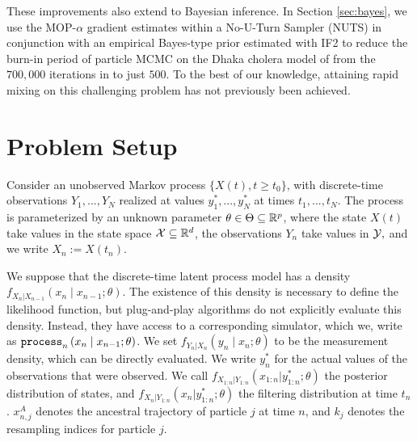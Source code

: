 \documentclass[9pt,twocolumn,pnasresearcharticle]{pnas-new}
\newcommand\arxiv[2]{#2} %
\begin{document}
These improvements also extend to Bayesian inference. In Section \ref{sec:bayes}, we use the MOP-$\alpha$ gradient estimates within a No-U-Turn Sampler (NUTS) \cite{homan14} in conjunction with an empirical Bayes-type prior estimated with IF2 to reduce the burn-in period of particle MCMC \cite{andrieu10} on the Dhaka cholera model of \cite{king08} from the $700,000$ iterations in \cite{fasiolo16} to just $500$. To the best of our knowledge, attaining rapid mixing on this challenging problem has not previously been achieved. 

\arxiv{}{\vspace*{-2mm}}
\section{Problem Setup}

Consider an unobserved Markov process $\{X(t),t  \geq t_0\}$, with discrete-time observations $Y_1,...,Y_N$ realized at values $y_1^*,...,y_N^*$ at times $t_1,..., t_N$.
The process is parameterized by an unknown parameter $\theta \in \Theta \subseteq \mathbb{R}^p$, where the state $X(t)$ take values in the state space ${\mathcal{X}} \subseteq \mathbb{R}^d$, the observations $Y_n$ take values in ${\mathcal{Y}},$ and we write $X_n := X(t_n)$. 


We suppose that the discrete-time latent process model has a density $f_{X_n|X_{n-1}}\left(x_{n} \mid x_{n-1}; \theta\right)$.
The existence of this density is necessary to define the likelihood function, but plug-and-play algorithms do not explicitly evaluate this density.
Instead, they have access to a corresponding simulator, which we, write as $\texttt{process}_n\left(x_n\mid x_{n-1}; \theta\right)$.
We set $f_{Y_n|X_n}\left(y_n \mid x_n; \theta\right)$ to be the measurement density, which  can be directly evaluated. We write $y_n^*$ for the actual values of the observations that were observed.
We call $f_{X_{1:n}|Y_{1:n}}(x_{1:n}|y_{1:n}^*; \theta)$ the posterior distribution of states, and $f_{X_{n}|Y_{1:n}}(x_n|y_{1:n}^*; \theta)$ the filtering distribution at time $t_n$.
$x_{n,j}^A$ denotes the ancestral trajectory of particle $j$ at time $n$,  and $k_j$
denotes the resampling indices for particle $j$. 
\end{document}
